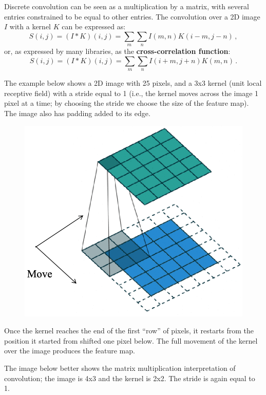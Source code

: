 Discrete convolution can be seen as a multiplication by a matrix, with several entries constrained to be equal to other entries. The convolution over a 2D image $I$ with a kernel $K$ can be expressed as:
\begin{equation*}
    S(i,j) = (I*K)(i,j) = \sum_m \sum_n I(m,n)K(i-m, j-n) \,,
\end{equation*}
or, as expressed by many libraries, as the \textbf{cross-correlation function}:
\begin{equation*}
    S(i,j) = (I*K)(i,j) = \sum_m \sum_n I(i+m,j+n)K(m, n) \,.
\end{equation*}

The example below shows a 2D image with 25 pixels, and a 3x3 kernel (unit local receptive field) with a stride equal to 1 (i.e., the kernel moves across the image 1 pixel at a time; by choosing the stride we choose the size of the feature map). The image also has padding added to its edge.
\begin{figure}[ht]
    \centering
    \includegraphics[width=0.6\linewidth]{img/CNN_2D.png} 
\end{figure}

Once the kernel reaches the end of the first ``row'' of pixels, it restarts from the position it started from shifted one pixel below. The full movement of the kernel over the image produces the feature map.

The image below better shows the matrix multiplication interpretation of convolution; the image is 4x3 and the kernel is 2x2. The stride is again equal to 1.

